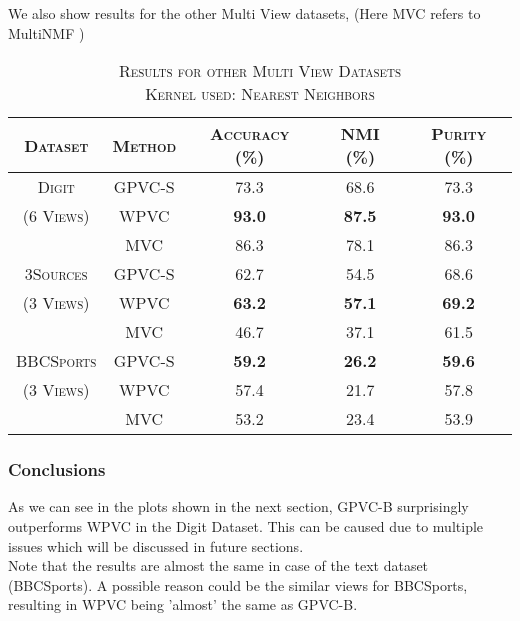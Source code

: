 \documentclass[a4paper]{article}
\begin{document}
	\noindent
	We also show results for the other Multi View datasets, (Here MVC refers to MultiNMF \cite{nmfsdm})	
	\begin{table}[h!]
	  \begin{center}
	    \begin{tabular}{c|c|c|c|c}
	      \toprule
		  \textsc{Dataset} & \textsc{Method} & \textsc{Accuracy (\%) } & \textsc{NMI (\%) } 
	      & \textsc{Purity (\%)} 	\\
            
		  \midrule
			\textsc{Digit} & \textsc{GPVC-S} & 73.3 & 68.6 & 73.3\\  
			\footnotesize\textsc{(6 Views)} & \textsc{WPVC} & \textbf{93.0} & \textbf{87.5} & \textbf{93.0}\\
			& \textsc{MVC} & 86.3 & 78.1 & 86.3\\  
		  \midrule
	    	\textsc{3Sources} & \textsc{GPVC-S} & 62.7 & 54.5 & 68.6\\  
			\footnotesize\textsc{(3 Views)} & \textsc{WPVC} & \textbf{63.2} & \textbf{57.1} & \textbf{69.2}\\
			& \textsc{MVC} & 46.7 & 37.1 & 61.5\\  
		  \midrule
	    	\textsc{BBCSports} & \textsc{GPVC-S} & \textbf{59.2} & \textbf{26.2} & \textbf{59.6}\\  
			\footnotesize\textsc{(3 Views)} & \textsc{WPVC} & {57.4} & {21.7} & {57.8}\\
			& \textsc{MVC} & 53.2 & 23.4 & 53.9\\  
		  \midrule

	    \end{tabular}
	    \caption*{\textsc{Results for other Multi View Datasets\\Kernel used: Nearest Neighbors}}
	  \end{center}
	\end{table}		


	\subsubsection{Conclusions}
	
	As we can see in the plots shown in the next section, GPVC-B surprisingly outperforms WPVC in the Digit Dataset. This can be caused due to multiple issues which will be discussed in future sections.\\
	Note that the results are almost the same in case of the text dataset (BBCSports). A possible reason could be the similar views for BBCSports, resulting in WPVC being 'almost' the same as GPVC-B.
\end{document}
